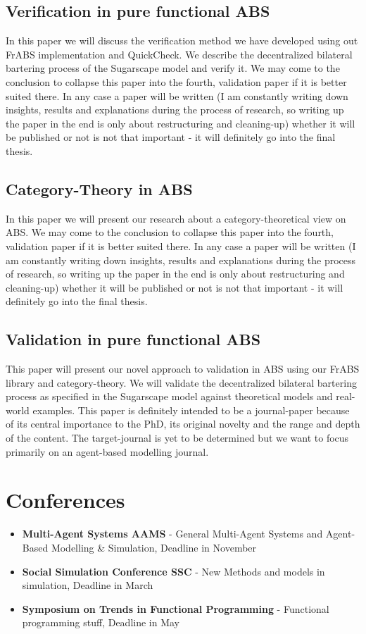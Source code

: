 \subsection{Verification in pure functional ABS}
In this paper we will discuss the verification method we have developed using out FrABS implementation and QuickCheck. We describe the decentralized bilateral bartering process of the Sugarscape model and verify it.
We may come to the conclusion to collapse this paper into the fourth, validation paper if it is better suited there. In any case a paper will be written (I am constantly writing down insights, results and explanations during the process of research, so writing up the paper in the end is only about restructuring and cleaning-up) whether it will be published or not is not that important - it will definitely go into the final thesis.

\subsection{Category-Theory in ABS}
In this paper we will present our research about a category-theoretical view on ABS. 
We may come to the conclusion to collapse this paper into the fourth, validation paper if it is better suited there. In any case a paper will be written (I am constantly writing down insights, results and explanations during the process of research, so writing up the paper in the end is only about restructuring and cleaning-up) whether it will be published or not is not that important - it will definitely go into the final thesis.

\subsection{Validation in pure functional ABS}
This paper will present our novel approach to validation in ABS using our FrABS library and category-theory. We will validate the decentralized bilateral bartering process as specified in the Sugarscape model against theoretical models and real-world examples. This paper is definitely intended to be a journal-paper because of its central importance to the PhD, its original novelty and the range and depth of the content. The target-journal is yet to be determined but we want to focus primarily on an agent-based modelling journal.

\section{Conferences}
\begin{itemize}
	\item \textbf{Multi-Agent Systems AAMS} - General Multi-Agent Systems and Agent-Based Modelling \& Simulation, Deadline in November
	\item \textbf{Social Simulation Conference SSC} - New Methods and models in simulation, Deadline in March
	\item \textbf{Symposium on Trends in Functional Programming} - Functional programming stuff, Deadline in May
\end{itemize}

